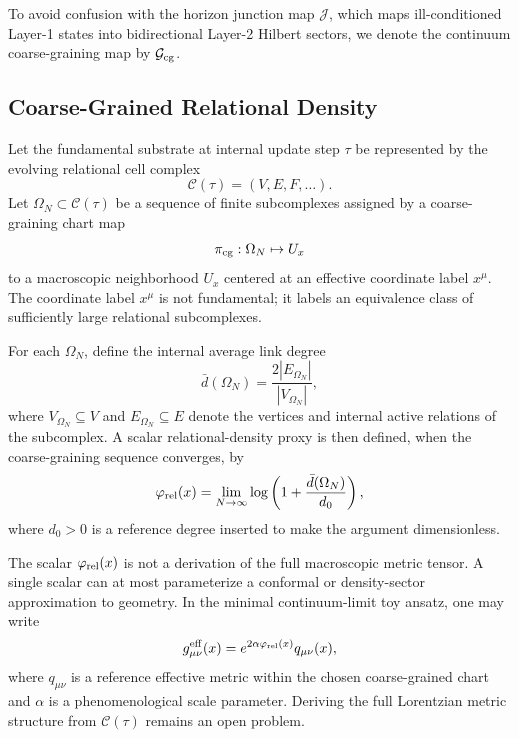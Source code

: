 \documentclass[11pt]{article}
\newcommand{\Ccal}{\mathcal{C}}
\newcommand{\Gcg}{\mathcal{G}_{\rm cg}}
\newcommand{\Jmap}{\mathcal{J}}
\begin{document}
To avoid confusion with the horizon junction map \(\Jmap\), which maps ill-conditioned Layer-1 states into bidirectional Layer-2 Hilbert sectors, we denote the continuum coarse-graining map by \(\Gcg\).

\subsection{Coarse-Grained Relational Density}

Let the fundamental substrate at internal update step \(\tau\) be represented by the evolving relational cell complex
\begin{equation}
    \Ccal(\tau)=(V,E,F,\ldots).
\end{equation}
Let \(\Omega_N\subset \Ccal(\tau)\) be a sequence of finite subcomplexes assigned by a coarse-graining chart map
\begin{equation}
    \pi_{\rm cg}: \Omega_N \mapsto U_x
\end{equation}
to a macroscopic neighborhood \(U_x\) centered at an effective coordinate label \(x^\mu\). The coordinate label \(x^\mu\) is not fundamental; it labels an equivalence class of sufficiently large relational subcomplexes.

For each \(\Omega_N\), define the internal average link degree
\begin{equation}
    \bar d(\Omega_N)=\frac{2|E_{\Omega_N}|}{|V_{\Omega_N}|},
\end{equation}
where \(V_{\Omega_N}\subseteq V\) and \(E_{\Omega_N}\subseteq E\) denote the vertices and internal active relations of the subcomplex. A scalar relational-density proxy is then defined, when the coarse-graining sequence converges, by
\begin{equation}
    \varphi_{\rm rel}(x)
    =
    \lim_{N\to\infty}
    \log\left(1+\frac{\bar d(\Omega_N)}{d_0}\right),
\end{equation}
where \(d_0>0\) is a reference degree inserted to make the argument dimensionless.

The scalar \(\varphi_{\rm rel}(x)\) is not a derivation of the full macroscopic metric tensor. A single scalar can at most parameterize a conformal or density-sector approximation to geometry. In the minimal continuum-limit toy ansatz, one may write
\begin{equation}
    g_{\mu\nu}^{\rm eff}(x)
    =
    e^{2\alpha \varphi_{\rm rel}(x)}q_{\mu\nu}(x),
\end{equation}
where \(q_{\mu\nu}\) is a reference effective metric within the chosen coarse-grained chart and \(\alpha\) is a phenomenological scale parameter. Deriving the full Lorentzian metric structure from \(\Ccal(\tau)\) remains an open problem.
\end{document}
